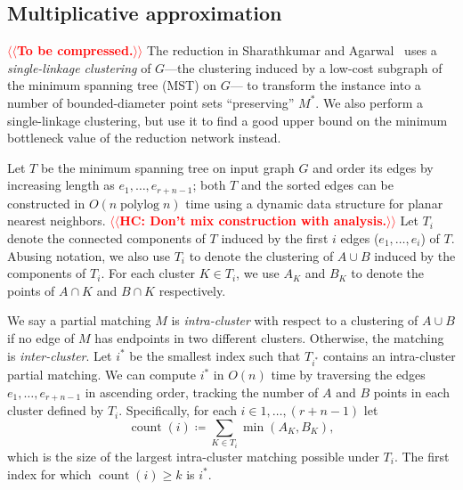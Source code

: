 \documentclass[a4paper,UKenglish]{socg-lipics-v2018}
\makeatletter
\def\polylog{\mathop{\mathrm{polylog}}}
\def\intracount{\operatorname{count}}
\theoremstyle{plain}
\numberwithin{figure}{section}
\def\EMPH#1{\textcolor{BrickRed}{{\emph{#1}}}}
\def\n@te#1{\textsf{\boldmath \textbf{$\langle\!\langle$#1$\rangle\!\rangle$}}\leavevmode}
\def\note#1{\textcolor{red}{\n@te{#1}}}
\makeatother
\begin{document}
\begin{toappendix}
\subsection{Multiplicative approximation}
\label{SSA:multiplicative-approx}

\note{To be compressed.}
The reduction in Sharathkumar and Agarwal~\cite{SA12} uses a
\EMPH{single-linkage clustering} of $G$---the clustering induced
by a low-cost subgraph of the minimum spanning tree (MST) on $G$---%
to transform the instance into a number of bounded-diameter point sets
``preserving'' $M^*$.
We also perform a single-linkage clustering, but use it to find a good upper
bound on the minimum bottleneck value of the reduction network instead.

Let $T$ be the minimum spanning tree on input graph $G$ and order
its edges by increasing length as $e_1, \ldots, e_{r+n-1}$;
both $T$ and the sorted edges can be constructed in $O(n\polylog n)$ time using
a dynamic data structure for planar nearest neighbors.
\note{HC: Don't mix construction with analysis.}
Let $T_i$ denote the connected components of $T$ induced by the first $i$
edges ($e_1, \ldots, e_{i}$) of $T$.
Abusing notation, we also use $T_i$ to denote the clustering of $A \cup B$
induced by the components of $T_i$.
For each cluster $K \in T_i$, we use $A_K$ and $B_K$ to denote the points of
$A \cap K$ and $B \cap K$ respectively.

We say a partial matching $M$ is \EMPH{intra-cluster} with respect to a clustering
of $A \cup B$ if no edge of $M$ has endpoints in two different clusters.
Otherwise, the matching is \EMPH{inter-cluster}.
Let $i^*$ be the smallest index such that $T_{i^*}$ contains an intra-cluster
partial matching.
We can compute $i^*$ in $O(n)$ time by traversing the edges
$e_1,\ldots ,e_{r+n-1}$ in ascending order, tracking the number of $A$ and $B$
points in each cluster defined by $T_i$.
Specifically, for each $i \in 1, \ldots, (r+n-1)$ let
\[
	\intracount(i) \coloneqq \sum_{K \in T_i} \min(A_K, B_K),
\]
which is the size of the largest intra-cluster matching possible under $T_i$.
The first index for which $\intracount(i) \geq k$ is $i^*$.


\end{toappendix}
\end{document}
